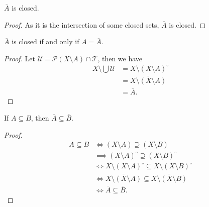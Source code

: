 \begin{proposition}
	$\overline A$ is closed.
	
	\begin{proof}
		As it is the intersection of some closed sets, $\overline A$ is closed.
	\end{proof}
\end{proposition}


\begin{proposition}
	$\overline A$ is closed if and only if $A = \overline A$.
	
	\begin{proof}
		Let $\mathcal U = \mathcal P(X \setminus A) \cap \mathcal T$, then we have
		$$
		\begin{aligned}
			X \setminus \bigcup \mathcal U &= X \setminus (X \setminus A)^\circ \\
			&= \overline{X \setminus (X \setminus A)} \\
			&= \overline A.
		\end{aligned}
		$$
	\end{proof}
\end{proposition}


\begin{proposition}
	If $A \subseteq B$, then $\overline A \subseteq \overline B$.
	
	\begin{proof}
		$$
		\begin{aligned}
			A \subseteq B &\iff (X \setminus A) \supseteq (X \setminus B) \\
			&\implies (X \setminus A)^\circ \supseteq (X \setminus B)^\circ \\
			&\iff X \setminus (X \setminus A)^\circ \subseteq X \setminus (X \setminus B)^\circ \\
			&\iff \overline{X \setminus (X \setminus A)} \subseteq \overline{X \setminus (X \setminus B)} \\
			&\iff \overline A \subseteq \overline B.
		\end{aligned}
		$$
	\end{proof}
\end{proposition}


